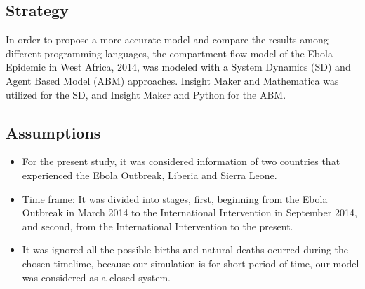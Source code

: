 \documentclass[10pt]{article}
\begin{document}
\subsection{Strategy}
In order to propose a more accurate model and compare the results among different programming  languages, the compartment flow model of the Ebola Epidemic in West Africa, 2014, was modeled with a System Dynamics (SD) and Agent Based Model (ABM) approaches.  Insight Maker and Mathematica was utilized  for the SD, and Insight Maker and Python for the ABM.

\subsection{Assumptions}
\begin{itemize}
\item For the present study, it was considered information of two countries that experienced the Ebola Outbreak, Liberia and Sierra Leone.
\item Time frame: It was divided into stages, first, beginning from the Ebola Outbreak in March 2014 to the International Intervention in September 2014, and second, from the International Intervention to the present.
\item It was ignored all the possible births and natural deaths ocurred during the chosen timelime, because our simulation is for short period of time, our model was considered as a closed system.
\end{itemize}
\end{document}
